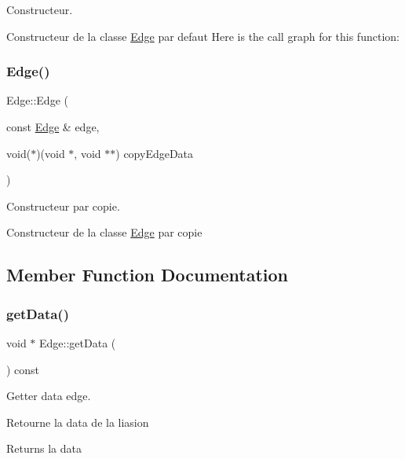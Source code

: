 Constructeur. 

Constructeur de la classe \mbox{\hyperlink{class_edge}{Edge}} par defaut Here is the call graph for this function\+:
\mbox{\label{class_edge_a12b460c6c0a255c44d564b033b056b02}} 
\subsubsection{\texorpdfstring{Edge()}{Edge()}\hspace{0.1cm}{\footnotesize\ttfamily [2/2]}}
{\footnotesize\ttfamily Edge\+::\+Edge (\begin{DoxyParamCaption}\item[{const \mbox{\hyperlink{class_edge}{Edge}} \&}]{edge,  }\item[{void($\ast$)(void $\ast$, void $\ast$$\ast$)}]{copy\+Edge\+Data }\end{DoxyParamCaption})}



Constructeur par copie. 

Constructeur de la classe \mbox{\hyperlink{class_edge}{Edge}} par copie 

\subsection{Member Function Documentation}
\mbox{\label{class_edge_abc0da055c4f1d3061973ef94bbcd27f2}} 
\subsubsection{\texorpdfstring{get\+Data()}{getData()}}
{\footnotesize\ttfamily void $\ast$ Edge\+::get\+Data (\begin{DoxyParamCaption}{ }\end{DoxyParamCaption}) const}



Getter data edge. 

Retourne la data de la liasion

\begin{DoxyReturn}{Returns}
la data 
\end{DoxyReturn}
\mbox{\label{class_edge_a03fa518cc47429dd74eb081ae004318b}} 
